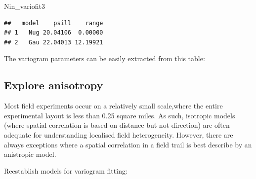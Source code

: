 \documentclass[
]{book}
\newenvironment{Shaded}{\begin{snugshade}}{\end{snugshade}}
\newcommand{\CommentTok}[1]{\textcolor[rgb]{0.56,0.35,0.01}{\textit{#1}}}
\newcommand{\DecValTok}[1]{\textcolor[rgb]{0.00,0.00,0.81}{#1}}
\newcommand{\FunctionTok}[1]{\textcolor[rgb]{0.13,0.29,0.53}{\textbf{#1}}}
\newcommand{\NormalTok}[1]{#1}
\newcommand{\OtherTok}[1]{\textcolor[rgb]{0.56,0.35,0.01}{#1}}
\newcommand{\SpecialCharTok}[1]{\textcolor[rgb]{0.81,0.36,0.00}{\textbf{#1}}}
\begin{document}
\begin{Shaded}
\begin{Highlighting}[]
\NormalTok{Nin\_variofit3}
\end{Highlighting}
\end{Shaded}

\begin{verbatim}
##   model    psill    range
## 1   Nug 20.04106  0.00000
## 2   Gau 22.04013 12.19921
\end{verbatim}

The variogram parameters can be easily extracted from this table:

\begin{Shaded}
\end{Shaded}

\hypertarget{explore-anisotropy}{%
\subsection{Explore anisotropy}\label{explore-anisotropy}}

Most field experiments occur on a relatively small scale,where the entire experimental layout is less than 0.25 square miles. As such, isotropic models (where spatial correlation is based on distance but not direction) are often adequate for understanding localised field heterogeneity. However, there are always exceptions where a spatial correlation in a field trail is best describe by an anistropic model.

Reestablish models for variogram fitting:
\end{document}
